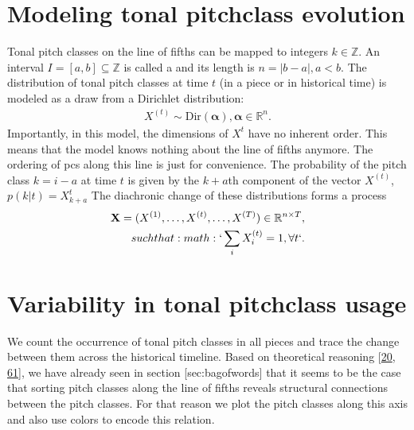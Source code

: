 \documentclass[letterpaper,10pt,english]{sphinxmanual}
\begin{document}
\section{Modeling tonal pitch\sphinxhyphen{}class evolution}
\label{\detokenize{history:modeling-tonal-pitch-class-evolution}}
\sphinxAtStartPar
Tonal pitch classes on the line of fifths can be mapped to integers
\(k \in \mathbb Z\). An interval \(I=[a,b]\subseteq\mathbb Z\)
is called a  and its length is
\(n=|b-a|, a<b\). The distribution of tonal pitch classes at time
\(t\) (in a piece or in historical time) is modeled as a draw from a
Dirichlet distribution:
\begin{equation*}
\begin{split}X^{(t)}\sim \mathrm{Dir}(\mathbf{\alpha}), \mathbf{\alpha}\in\mathbb R^n.\end{split}
\end{equation*}
\sphinxAtStartPar
Importantly, in this model, the dimensions of \(X^{t}\) have no
inherent order. This means that the model knows nothing about the line
of fifths anymore. The ordering of pcs along this line is just for
convenience. The probability of the pitch class \(k = i-a\) at time
\(t\) is given by the \(k+a\)th component of the vector
\(X^{(t)}\), \(p(k | t)=X_{k+a}^{t}\) The diachronic change of
these distributions forms a process
\begin{align*}\!\begin{aligned}
\mathbf{X}=(X^{(1)},\dots,X^{(t)},\dots,X^{(T)})\in \mathbb R^{n\times T},\\
such that :math:`\sum_i X_i^{(t)}=1,\forall t`.\\
\end{aligned}\end{align*}

\section{Variability in tonal pitch\sphinxhyphen{}class usage}
\label{\detokenize{history:variability-in-tonal-pitch-class-usage}}
\sphinxAtStartPar
We count the occurrence of tonal pitch classes in all pieces and trace
the change between them across the historical timeline. Based on
theoretical reasoning {[}\hyperlink{cite.8_bibliography:id67}{20}, \hyperlink{cite.8_bibliography:id44}{61}{]},
we have already seen in section {[}sec:bagofwords{]} that it seems to be the
case that sorting pitch classes along the line of fifths reveals
structural connections between the pitch classes. For that reason we
plot the pitch classes along this axis and also use colors to encode
this relation.
\end{document}
